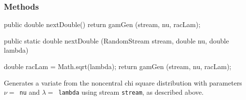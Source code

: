 \subsubsection* {Methods}
\begin{code}\begin{hide}

   public double nextDouble() {
      return gamGen (stream, nu, racLam);
   }\end{hide}

   public static double nextDouble (RandomStream stream,
                                    double nu, double lambda) \begin{hide} {
      double racLam = Math.sqrt(lambda);
      return gamGen (stream, nu, racLam);
   }\end{hide}
\end{code}
 \begin{tabb}  Generates a variate from the noncentral chi square
   distribution with parameters $\nu = $~\texttt{nu} and $\lambda =
   $~\texttt{lambda} using stream \texttt{stream}, as described above.
 \end{tabb}
\begin{code}\begin{hide}

//>>>>>>>>>>>>>>>>>>>>  P R I V A T E    M E T H O D S   <<<<<<<<<<<<<<<<<<<<

   private static double gamGen (RandomStream s, double nu, double racLam) {
      // racLam = sqrt(lambda)
      double x = NormalACRGen.nextDouble (s, racLam, 1.0);
      double y = GammaAcceptanceRejectionGen.nextDouble(s, 0.5*(nu - 1.0), 0.5);
      return x*x + y;
   }

}\end{hide}
\end{code}
